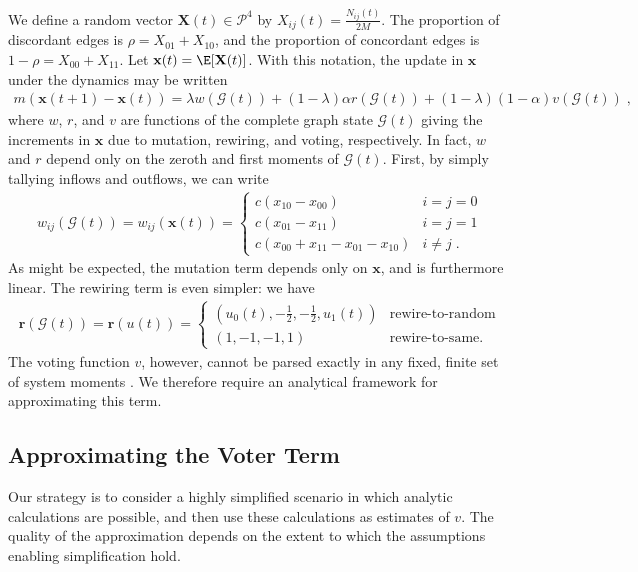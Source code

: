 \documentclass[english]{scrartcl}
\begin{document}
		We define a random vector $\mathbf{X}(t) \in \mathcal{P}^4$ by $X_{ij}(t) = \frac{N_{ij}(t)}{2M}$. 
		The proportion of discordant edges is $\rho = X_{01} + X_{10}$, and the proportion of concordant edges is $1 - \rho = X_{00} + X_{11}$. 
		Let $\mathbf{x}(t) = \E[\mathbf{X}(t)]$. 
		With this notation, the update in $\mathbf{x}$ under the dynamics may be written
		\begin{align}
			m(\mathbf{x}(t+1) - \mathbf{x}(t)) = \lambda w(\mathcal{G}(t)) + (1-\lambda)\alpha r(\mathcal{G}(t)) + (1-\lambda)(1-\alpha) v(\mathcal{G}(t))\;, \label{eq:dynamics}
		\end{align}
		where $w$, $r$, and $v$ are functions of the complete graph state $\mathcal{G}(t)$ giving the increments in $\mathbf{x}$ due to mutation, rewiring, and voting, respectively. 
		In fact, $w$ and $r$ depend only on the zeroth and first moments of $\mathcal{G}(t)$. 
		First, by simply tallying inflows and outflows, we can write
		\begin{align}
			w_{ij}(\mathcal{G}(t)) = w_{ij}(\mathbf{x}(t)) = 
			\begin{cases}
				c(x_{10}-x_{00}) & i = j = 0\\ 
				c(x_{01}-x_{11}) & i = j = 1\\ 
				c(x_{00} + x_{11} - x_{01} - x_{10}) & i \neq j\;.
			\end{cases}
		\end{align}
		As might be expected, the mutation term depends only on $\mathbf{x}$, and is furthermore linear. 
		The rewiring term is even simpler: we have  
		\begin{align}
			\mathbf{r}(\mathcal{G}(t)) = \mathbf{r}(u(t)) = 
			\begin{cases}
				\left(u_0(t), -\frac{1}{2}, -\frac{1}{2}, u_1(t)\right) & \text{rewire-to-random}\\
				\left(1, -1, -1, 1\right) & \text{rewire-to-same}.
			\end{cases}
		\end{align}
		The voting function $v$, however, cannot be parsed exactly in any fixed, finite set of system moments \cite{Demirel2012}. 
		We therefore require an analytical framework for approximating this term. 
		
	\subsection{Approximating the Voter Term}

		Our strategy is to consider a highly simplified scenario in which analytic calculations are possible, and then use these calculations as estimates of $v$. 
		The quality of the approximation depends on the extent to which the assumptions enabling simplification hold. 
\end{document}
